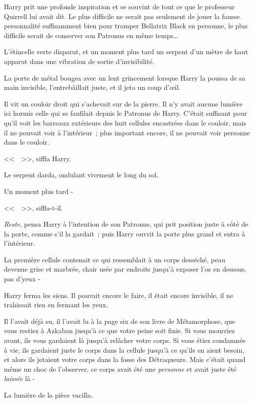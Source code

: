 Harry prit une profonde inspiration et se souvint de tout ce que le professeur Quirrell lui avait dit. Le plus difficile ne serait pas seulement de jouer la fausse personnalité suffisamment bien pour tromper Bellatrix Black en personne, le plus difficile serait de conserver son Patronus en même temps…

L'étincelle verte disparut, et un moment plus tard un serpent d'un mètre de haut apparut dans une vibration de sortie d'invisibilité.

La porte de métal bougea avec un lent grincement lorsque Harry la poussa de sa main invisible, l'entrebâillait juste, et il jeta un coup d'œil.

Il vit un couloir droit qui s'achevait sur de la pierre. Il n'y avait aucune lumière ici hormis celle qui se faufilait depuis le Patronus de Harry. C'était suffisant pour qu'il voit les barreaux extérieurs des huit cellules encastrées dans le couloir, mais il ne pouvait voir à l'intérieur~; plus important encore, il ne pouvait voir personne dans le couloir.

<<~~>>, siffla Harry.

Le serpent darda, ondulant vivement le long du sol.

Un moment plus tard -

<<~~>>, siffla-t-il.

\emph{Reste}, pensa Harry à l'intention de son Patronus, qui prit position juste à côté de la porte, comme s'il la gardait~; puis Harry ouvrit la porte plus grand et entra à l'intérieur.

La première cellule contenait ce qui ressemblait à un corps desséché, peau devenue grise et marbrée, chair usée par endroits jusqu'à exposer l'os en dessous, pas d'yeux -

Harry ferma les siens. Il pouvait encore le faire, il était encore invisible, il ne trahissait rien en fermant les yeux.

Il l'avait déjà su, il l'avait lu à la page six de son livre de Métamorphose, que vous restiez à Azkaban jusqu'à ce que votre peine soit finie. Si vous mourriez avant, ils vous gardaient là jusqu'à relâcher votre corps. Si vous étiez condamnée à vie, ils gardaient juste le corps dans la cellule jusqu'à ce qu'ils en aient besoin, et alors ils jetaient votre corps dans la fosse des Détraqueurs. Mais c'était quand même un choc de l'observer, ce corps avait été une \emph{personne} et avait juste été \emph{laissée} là -

La lumière de la pièce vacilla.

